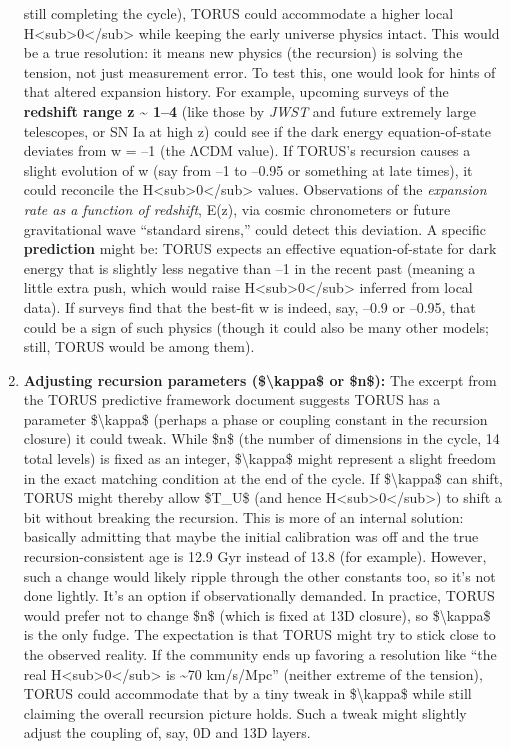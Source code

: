 \documentclass[]{article}
\begin{document}
\begin{enumerate}
  still completing the cycle), TORUS could accommodate a higher local
  H\textless{}sub\textgreater{}0\textless{}/sub\textgreater{} while
  keeping the early universe physics intact​. This would be a true
  resolution: it means new physics (the recursion) is solving the
  tension, not just measurement error. To test this, one would look for
  hints of that altered expansion history. For example, upcoming surveys
  of the \textbf{redshift range z \textasciitilde{} 1--4} (like those by
  \emph{JWST} and future extremely large telescopes, or SN Ia at high z)
  could see if the dark energy equation-of-state deviates from w = --1
  (the ΛCDM value). If TORUS's recursion causes a slight evolution of w
  (say from --1 to --0.95 or something at late times), it could
  reconcile the
  H\textless{}sub\textgreater{}0\textless{}/sub\textgreater{} values.
  Observations of the \emph{expansion rate as a function of redshift},
  E(z), via cosmic chronometers or future gravitational wave ``standard
  sirens,'' could detect this deviation. A specific \textbf{prediction}
  might be: TORUS expects an effective equation-of-state for dark energy
  that is slightly less negative than --1 in the recent past (meaning a
  little extra push, which would raise
  H\textless{}sub\textgreater{}0\textless{}/sub\textgreater{} inferred
  from local data)​. If surveys find that the best-fit w is indeed, say,
  --0.9 or --0.95, that could be a sign of such physics (though it could
  also be many other models; still, TORUS would be among them).
\item
  \textbf{Adjusting recursion parameters (\$\textbackslash{}kappa\$ or
  \$n\$):} The excerpt from the TORUS predictive framework document
  suggests TORUS has a parameter \$\textbackslash{}kappa\$ (perhaps a
  phase or coupling constant in the recursion closure) it could tweak​.
  While \$n\$ (the number of dimensions in the cycle, 14 total levels)
  is fixed as an integer, \$\textbackslash{}kappa\$ might represent a
  slight freedom in the exact matching condition at the end of the
  cycle. If \$\textbackslash{}kappa\$ can shift, TORUS might thereby
  allow \$T\_U\$ (and hence
  H\textless{}sub\textgreater{}0\textless{}/sub\textgreater{}) to shift
  a bit without breaking the recursion. This is more of an internal
  solution: basically admitting that maybe the initial calibration was
  off and the true recursion-consistent age is 12.9 Gyr instead of 13.8
  (for example). However, such a change would likely ripple through the
  other constants too, so it's not done lightly. It's an option if
  observationally demanded. In practice, TORUS would prefer not to
  change \$n\$ (which is fixed at 13D closure), so
  \$\textbackslash{}kappa\$ is the only fudge. The expectation is that
  TORUS might try to stick close to the observed reality. If the
  community ends up favoring a resolution like ``the real
  H\textless{}sub\textgreater{}0\textless{}/sub\textgreater{} is
  \textasciitilde{}70 km/s/Mpc'' (neither extreme of the tension), TORUS
  could accommodate that by a tiny tweak in \$\textbackslash{}kappa\$
  while still claiming the overall recursion picture holds​. Such a
  tweak might slightly adjust the coupling of, say, 0D and 13D layers.
\end{enumerate}
\end{document}

